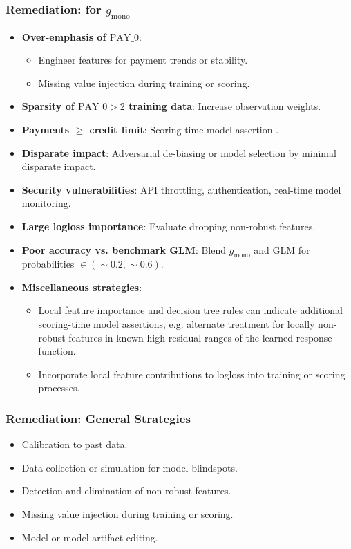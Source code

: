 \documentclass[11pt,
               aspectratio=43,
               hyperref={colorlinks}
               ]{beamer}
\begin{document}
			\begin{frame}
		
				\frametitle{\textbf{Remediation}: for $g_{\text{mono}}$}
				
				\begin{itemize}\scriptsize
					\item \textbf{Over-emphasis of $\text{PAY\_0}$}:
					\begin{itemize}\scriptsize
						\item Engineer features for payment trends or stability.
						\item Missing value injection during training or scoring.
					\end{itemize}
					\item \textbf{Sparsity of $\text{PAY\_0} > 2$ training data}: Increase observation weights. 
					\item \textbf{Payments $\geq$ credit limit}: Scoring-time model assertion \cite{kangdebugging}. 
					\item \textbf{Disparate impact}: Adversarial de-biasing \cite{zhang2018mitigating} or model selection by minimal disparate impact. 
					\item \textbf{Security vulnerabilities}: API throttling, authentication, real-time model monitoring. 
					\item \textbf{Large logloss importance}: Evaluate dropping non-robust features.
					\item \textbf{Poor accuracy vs. benchmark GLM}: Blend $g_{\text{mono}}$ and GLM for probabilities $\in (\sim0.2, \sim0.6)$.
					\item \textbf{Miscellaneous strategies}: 
					\begin{itemize}\scriptsize
						\item Local feature importance and decision tree rules can indicate additional scoring-time model assertions, e.g. alternate treatment for locally non-robust features in known high-residual ranges of the learned response function. 
						\item Incorporate local feature contributions to logloss into training or scoring processes.
					\end{itemize}
				\end{itemize}
				\normalsize

			\end{frame}		
			
			\begin{frame}
		
				\frametitle{\textbf{Remediation}: General Strategies}

				\begin{itemize}
					\item Calibration to past data.
					\item Data collection or simulation for model blindspots.
					\item Detection and elimination of non-robust features.
					\item Missing value injection during training or scoring.
					\item Model or model artifact editing.
				\end{itemize}				
				
			\end{frame}
\end{document}
